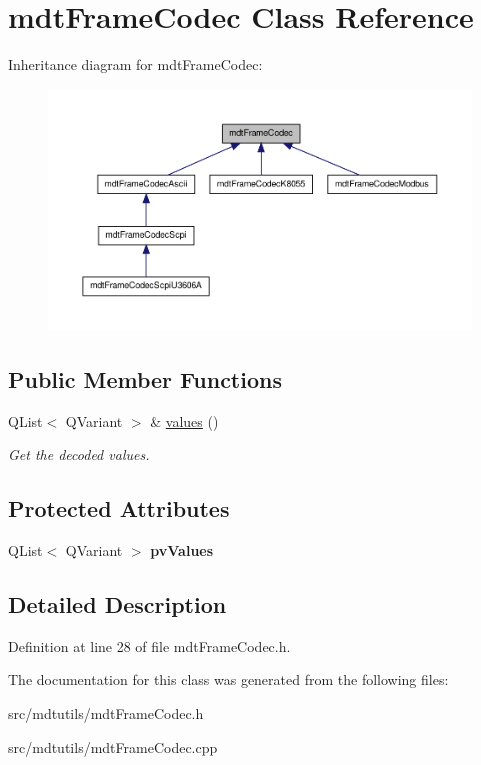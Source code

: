 \hypertarget{classmdt_frame_codec}{
\section{mdtFrameCodec Class Reference}
\label{classmdt_frame_codec}
}


Inheritance diagram for mdtFrameCodec:\nopagebreak
\begin{figure}[H]
\begin{center}
\leavevmode
\includegraphics[width=400pt]{classmdt_frame_codec__inherit__graph}
\end{center}
\end{figure}
\subsection*{Public Member Functions}
\begin{DoxyCompactItemize}
\item 
\hypertarget{classmdt_frame_codec_a2c0cc0f9d9b72ef2295b7ec7eca72ea7}{
QList$<$ QVariant $>$ \& \hyperlink{classmdt_frame_codec_a2c0cc0f9d9b72ef2295b7ec7eca72ea7}{values} ()}
\label{classmdt_frame_codec_a2c0cc0f9d9b72ef2295b7ec7eca72ea7}

\begin{DoxyCompactList}\small\item\em Get the decoded values. \end{DoxyCompactList}\end{DoxyCompactItemize}
\subsection*{Protected Attributes}
\begin{DoxyCompactItemize}
\item 
\hypertarget{classmdt_frame_codec_a3e7dc48b11dda3688f48eea2030f0953}{
QList$<$ QVariant $>$ {\bfseries pvValues}}
\label{classmdt_frame_codec_a3e7dc48b11dda3688f48eea2030f0953}

\end{DoxyCompactItemize}


\subsection{Detailed Description}


Definition at line 28 of file mdtFrameCodec.h.



The documentation for this class was generated from the following files:\begin{DoxyCompactItemize}
\item 
src/mdtutils/mdtFrameCodec.h\item 
src/mdtutils/mdtFrameCodec.cpp\end{DoxyCompactItemize}
